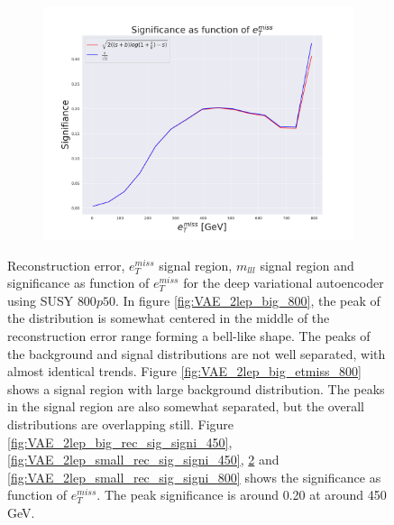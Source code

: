 \begin{figure}[H]
    \begin{subfigure}{.50\textwidth}
        \includegraphics[width=\textwidth]{Figures/VAE_testing/big/2lep/significance_etmiss_800p0p050_-0.7232197345309495.pdf}
        \caption{}
        \label{fig:VAE_2lep_big_signi_800}
    \end{subfigure}
    \hfill      
    \caption[2lep deep network | $800p50$ | VAE]{Reconstruction error, $e_T^{miss}$ signal region, $m_{lll}$ signal region and significance as function of 
    $e_T^{miss}$ for the deep variational autoencoder using SUSY $800p50$.
    In figure  \ref{fig:VAE_2lep_big_800}, 
the peak of the distribution is somewhat centered in the middle 
of the reconstruction error range forming a bell-like shape. The peaks of the background and signal 
distributions are not well separated, with almost identical trends. Figure 
\ref{fig:VAE_2lep_big_etmiss_800} 
shows a signal region with large background distribution. The peaks in the signal region are also somewhat 
separated, but the overall distributions are overlapping still. 
Figure \ref{fig:VAE_2lep_big_rec_sig_signi_450}, \ref{fig:VAE_2lep_small_rec_sig_signi_450}, 
\ref{fig:VAE_2lep_big_rec_sig_signi_800} and \ref{fig:VAE_2lep_small_rec_sig_signi_800}
shows the significance as function of $e_T^{miss}$. 
The peak significance is around 0.20 at around 450 GeV.}
    \label{fig:VAE_2lep_big_rec_sig_signi_800}
\end{figure}

